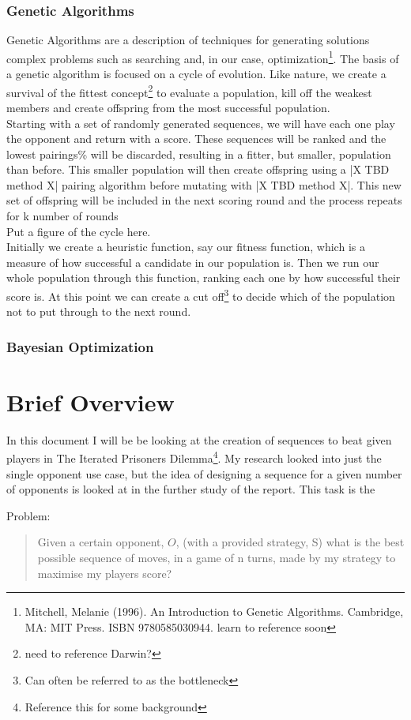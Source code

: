 \subsubsection{Genetic Algorithms}\label{ssec:genetic algorthems}
Genetic Algorithms are a description of techniques for generating solutions complex problems such as searching and, in our case, optimization\footnote{Mitchell, Melanie (1996). An Introduction to Genetic Algorithms. Cambridge, MA: MIT Press. ISBN 9780585030944. learn to reference soon}. The basis of a genetic algorithm is focused on a cycle of evolution. Like nature, we create a survival of the fittest concept\footnote{need to reference Darwin?} to evaluate a population, kill off the weakest members and create offspring from the most successful population.\\

Starting with a set of randomly generated sequences, we will have each one play the opponent and return with a score. 
These sequences will be ranked and the lowest pairings\% will be discarded, resulting in a fitter, but smaller, population than before.
This smaller population will then create offspring using a |X TBD method X| pairing algorithm before mutating with |X TBD method X|. This new set of offspring will be included in the next scoring round and the process repeats for k number of rounds\\

Put a figure of the cycle here.\label{fig:genetic algo cycle} \\

Initially we create a heuristic function, say our fitness function, which is a measure of how successful a candidate in our population is. Then we run our whole population through this function, ranking each one by how successful their score is. At this point we can create a cut off\footnote{Can often be referred to as the bottleneck} to decide which of the population not to put through to the next round.\\
\subsubsection{Bayesian Optimization}

\section{Brief Overview}
In this document I will be be looking at the creation of sequences to beat given players in The Iterated Prisoners Dilemma\footnote{Reference this for some background}. My research looked into just the single opponent use case, but the idea of designing a sequence for a given number of opponents is looked at in the further study of the report. This task is the


Problem:\\
\begin{quotation}
    Given a certain opponent, \(O\), (with a provided strategy, S) what is the best possible sequence of moves, in a game of n turns, made by my strategy to maximise my players score?
\end{quotation}

